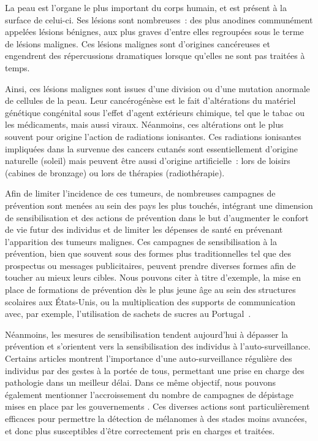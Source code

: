 \renewcommand{\thechapter}{\roman{chapter}}
\setcounter{chapter}{1}
\setcounter{figure}{0}

\label{chap:introduction}
La peau est l'organe le plus important du corps humain, et est présent à la surface de celui-ci. Ses lésions sont nombreuses~: des plus anodines communément appelées lésions bénignes, aux plus graves d'entre elles regroupées sous le terme de lésions malignes. Ces lésions malignes sont d'origines cancéreuses et engendrent des répercussions dramatiques lorsque qu'elles ne sont pas traitées à temps.\par

Ainsi, ces lésions malignes sont issues d’une division ou d’une mutation anormale de cellules de la peau. Leur cancérogénèse est le fait d'altérations du matériel génétique congénital sous l'effet d'agent extérieurs chimique, tel que le tabac ou les médicaments, mais aussi viraux. Néanmoins, ces altérations ont le plus souvent pour origine l'action de radiations ionisantes. Ces radiations ionisantes impliquées dans la survenue des cancers cutanés sont essentiellement d'origine naturelle (soleil) mais peuvent être aussi d'origine artificielle~: lors de loisirs (cabines de bronzage) ou lors de thérapies (radiothérapie).\par

Afin de limiter l’incidence de ces tumeurs, de nombreuses campagnes de prévention sont menées au sein des pays les plus touchés, intégrant une dimension de sensibilisation et des actions de prévention dans le but d’augmenter le confort de vie futur des individus et de limiter les dépenses de santé en prévenant l'apparition des tumeurs malignes. Ces campagnes de sensibilisation à la prévention, bien que souvent sous des formes plus traditionnelles tel que des prospectus ou messages publicitaires, peuvent prendre diverses formes afin de toucher au mieux leurs cibles. Nous pouvons citer à titre d’exemple, la mise en place de formations de prévention dès le plus jeune âge au sein des structures scolaires aux États-Unis, ou la multiplication des supports de communication avec, par exemple, l’utilisation de sachets de sucres au Portugal~\cite{Correia2017,Guy2016}.\par 

Néanmoins, les mesures de sensibilisation tendent aujourd’hui à dépasser la prévention et s'orientent vers la sensibilisation des individus à l'auto-surveillance. Certains articles montrent l’importance d’une auto-surveillance régulière des individus par des gestes à la portée de tous, permettant une prise en charge des pathologie dans un meilleur délai. Dans ce même objectif, nous pouvons également mentionner l’accroissement du nombre de campagnes de dépistage mises en place par les gouvernements \cite{Friedman1985}. Ces diverses actions sont particulièrement efficaces pour permettre la détection de mélanomes à des stades moins avancées, et donc plus susceptibles d'être correctement pris en charges et traitées.\par

